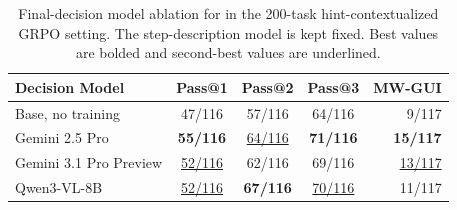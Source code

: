 \begin{table}[h]
\centering
\paperTable
\caption{Final-decision model ablation for  in the 200-task hint-contextualized GRPO setting. The step-description model is kept fixed. Best values are bolded and second-best values are underlined.}
\label{tab:evaluator_model_ablation_main}
\begin{tabular}{@{}l c c c r@{}}
\toprule
\textbf{Decision Model} & \textbf{Pass@1} & \textbf{Pass@2} & \textbf{Pass@3} & \textbf{MW-GUI} \\
\midrule
Base, no training & 47/116 & 57/116 & 64/116 & 9/117 \\
\rowcolor{oursrowcolor}
Gemini 2.5 Pro & \textbf{55/116} & \underline{64/116} & \textbf{71/116} & \textbf{15/117} \\
Gemini 3.1 Pro Preview & \underline{52/116} & 62/116 & 69/116 & \underline{13/117} \\
Qwen3-VL-8B & \underline{52/116} & \textbf{67/116} & \underline{70/116} & 11/117 \\
\bottomrule
\end{tabular}
\end{table}
